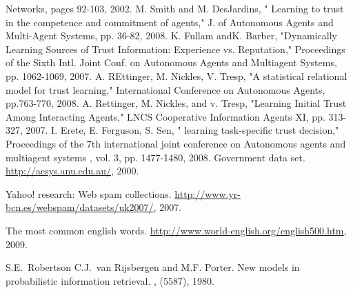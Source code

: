 \documentclass{llncs}
\begin{document}
\begin{thebibliography}{99.}
Networks, pages 92-103, 2002.
 M. Smith and M. DesJardins, " Learning to trust in the competence and commitment of agents," J. of 	Autonomous Agents and Multi-Agent Systems, pp. 36-82, 2008. 
 K. Fullam andK. Barber, "Dynamically Learning Sources of Trust Information: Experience vs. Reputation," Proceedings of the Sixth Intl. Joint Conf. on Autonomous Agents and Multiagent Systems, pp. 1062-1069, 2007.
 A. REttinger, M. Nickles, V. Tresp, "A statistical relational model for trust learning," International Conference on Autonomous Agents,  pp.763-770, 2008. 
 A. Rettinger, M. Nickles, and v. Tresp,  "Learning Initial Trust Among Interacting Agents," LNCS Cooperative Information Agents XI, pp. 313-327, 2007.
 I. Erete, E. Ferguson, S. Sen, " learning task-specific trust decision," Proceedings of the 7th international joint conference on Autonomous agents and multiagent systems , vol. 3,  pp. 1477-1480, 2008.
Government data set.
\newblock \url{http://acsys.anu.edu.au/}, 2000.

Yahoo! research: Web spam collections.
\newblock \url{http://www.yr-bcn.es/webspam/datasets/uk2007/}, 2007.

The most common english words.
\newblock \url{http://www.world-english.org/english500.htm}, 2009.

S.E.~Robertson C.J.~van Rijsbergen and M.F. Porter.
\newblock New models in probabilistic information retrieval.
, (5587), 1980.


\end{thebibliography}
\end{document}
